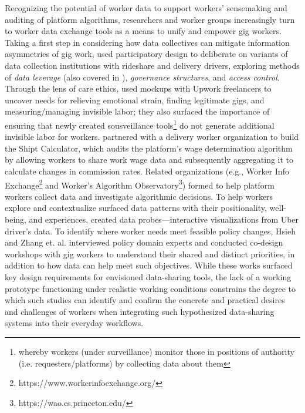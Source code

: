 Recognizing the potential of worker data to support workers' sensemaking and auditing of platform algorithms, researchers and worker groups increasingly turn to worker data exchange tools as a means to {unify and} empower gig workers.  
{Taking a first step in considering how data collectives can mitigate information asymmetries of gig work, }\citet{stein2023you} {used participatory design to deliberate on} variants of data collection institutions with rideshare and delivery drivers, exploring methods of \textit{data leverage} (also covered in \cite{levers}), \textit{governance structures}, and \textit{access control}.
Through the lens of care ethics, \citet{sousveillance} used mockups with Upwork freelancers to uncover needs for relieving emotional strain, finding legitimate gigs, and measuring/managing invisible labor; they also surfaced the importance of ensuring that newly created sousveillance tools\footnote{whereby workers (under surveillance) monitor those in positions of authority (i.e. requesters/platforms) by collecting data about them} do not generate additional invisible labor for workers. 
\citet{calacci2022bargaining} partnered with a delivery worker organization to {build} the Shipt Calculator, which {audits the platform's wage determination algorithm by allowing workers to} share work wage data and subsequently aggregat{ing it to calculate changes in} commission rate{s}. 
{Related} organizations (e.g., Worker Info Exchange\footnote{https://www.workerinfoexchange.org/} and Worker's Algorithm Observatory\footnote{https://wao.cs.princeton.edu/}) formed to help platform workers collect data and investigate algorithmic decisions. 
To help {workers} explore and contextualize {surfaced} data patterns with their positionality, well-being, and experiences, \citet{zhang2023stakeholder} create{d} data probes---interactive visualizations from {Uber driver}'s data. {To identify where worker needs meet feasible policy changes, Hsieh and Zhang et. al.} \cite{supporting} interviewed policy domain experts and conducted co-design workshops with gig workers to {understand their shared and distinct priorities, in addition to how data can help meet such objectives. While these works surfaced key design requirements for envisioned data-sharing tools, the lack of a working prototype functioning under realistic working conditions constrains the degree to which such studies can identify and confirm the concrete and practical desires and challenges of workers when integrating such hypothesized data-sharing systems into their everyday workflows}.

